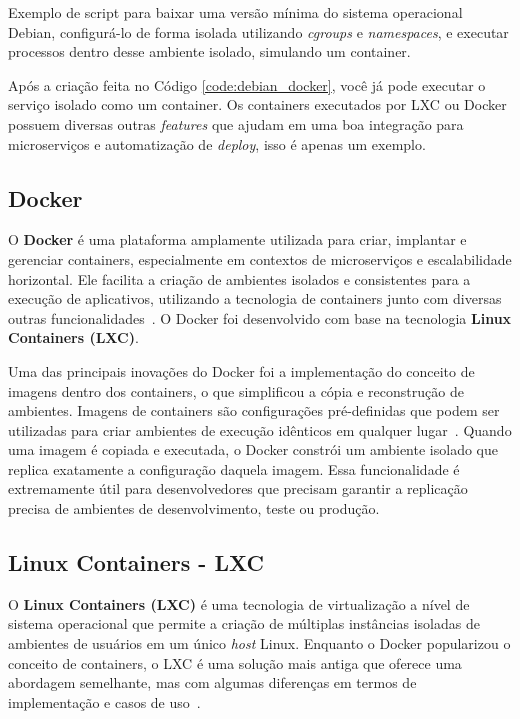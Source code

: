 \begin{listing}[h!]
  \noindent{}  
\caption{Exemplo de script para baixar uma versão mínima do sistema operacional Debian, configurá-lo de forma isolada utilizando \textit{cgroups} e \textit{namespaces}, e executar processos dentro desse ambiente isolado, simulando um container.}
\label{code:debian_docker}
\end{listing}


Após a criação feita no Código \ref{code:debian_docker}, você já pode executar o serviço isolado como um container. Os containers executados por LXC ou Docker possuem diversas outras \textit{features} que ajudam em uma boa integração para microserviços e automatização de \textit{deploy}, isso é apenas um exemplo.

\subsection{Docker}

O \textbf{Docker} é uma plataforma amplamente utilizada para criar, implantar e gerenciar containers, especialmente em contextos de microserviços e escalabilidade horizontal. Ele facilita a criação de ambientes isolados e consistentes para a execução de aplicativos, utilizando a tecnologia de containers junto com diversas outras funcionalidades~\citep{DockerDocumentation}. O Docker foi desenvolvido com base na tecnologia \textbf{Linux Containers (LXC)}.

Uma das principais inovações do Docker foi a implementação do conceito de imagens dentro dos containers, o que simplificou a cópia e reconstrução de ambientes. Imagens de containers são configurações pré-definidas que podem ser utilizadas para criar ambientes de execução idênticos em qualquer lugar~\citep{DockerDocumentation}. Quando uma imagem é copiada e executada, o Docker constrói um ambiente isolado que replica exatamente a configuração daquela imagem. Essa funcionalidade é extremamente útil para desenvolvedores que precisam garantir a replicação precisa de ambientes de desenvolvimento, teste ou produção.

\subsection{Linux Containers - LXC}  
O \textbf{Linux Containers (LXC)} é uma tecnologia de virtualização a nível de sistema operacional que permite a criação de múltiplas instâncias isoladas de ambientes de usuários em um único \textit{host} Linux. Enquanto o Docker popularizou o conceito de containers, o LXC é uma solução mais antiga que oferece uma abordagem semelhante, mas com algumas diferenças em termos de implementação e casos de uso~\citep{WhatIsDocker}.

